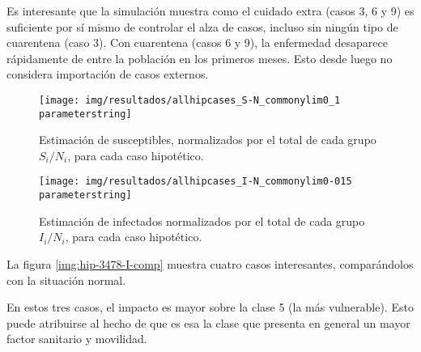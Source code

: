 Es interesante que la simulación muestra como el cuidado extra (casos 3, 6 y 9) es suficiente por sí mismo de controlar el alza de casos, incluso sin ningún tipo de cuarentena (caso 3). Con cuarentena (casos 6 y 9), la enfermedad desaparece rápidamente de entre la población en los primeros meses. Esto desde luego no considera importación de casos externos.

\begin{figure}[h]
\centering
\texttt{[image: img/resultados/allhipcases\_S-N\_commonylim0\_1\\parameterstring]}
\caption{Estimación de susceptibles, normalizados por el total de cada grupo \(S_i/N_i\), para cada caso hipotético.}
\label{img:all-hip-S-N}
\end{figure}

\begin{figure}[h]
\centering
\texttt{[image: img/resultados/allhipcases\_I-N\_commonylim0-015\\parameterstring]}
\caption{Estimación de infectados normalizados por el total de cada grupo \(I_i/N_i\), para cada caso hipotético.}
\label{img:all-hip-I-N}
\end{figure}

La figura \ref{img:hip-3478-I-comp} muestra cuatro casos interesantes, comparándolos con la situación normal. 




En estos tres casos, el impacto es mayor sobre la clase 5 (la más vulnerable). Esto puede atribuirse al hecho de que es esa la clase que presenta en general un mayor factor sanitario y movilidad.
 
 


